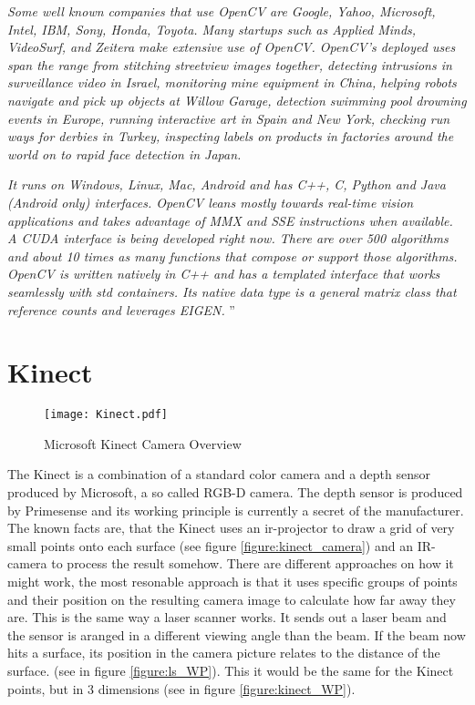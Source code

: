 \textit{ 
Some well known companies that use OpenCV are Google, Yahoo, Microsoft, Intel, IBM, Sony, Honda, Toyota. 
Many startups such as Applied Minds, VideoSurf, and Zeitera make extensive use of OpenCV. OpenCV’s deployed 
uses span the range from stitching streetview images together, detecting intrusions in surveillance video in 
Israel, monitoring mine equipment in China, helping robots navigate and pick up objects at Willow Garage, 
detection swimming pool drowning events in Europe, running interactive art in Spain and New York, checking
run ways for derbies in Turkey, inspecting labels on products in factories around the world on to rapid face
 detection in Japan.
}

\textit{ 
It runs on Windows, Linux, Mac, Android and has C++, C, Python and Java (Android only) interfaces. 
OpenCV leans mostly towards real-time vision applications and takes advantage of MMX and SSE instructions
 when available. A CUDA interface is being developed right now. There are over 500 algorithms and about 10 
 times as many functions that compose or support those algorithms. OpenCV is written natively in C++ and has 
 a templated interface that works seamlessly with std containers. Its native data type is a general matrix class 
 that reference counts and leverages EIGEN.
}''
\section{Kinect}
\begin{figure}[htp]
	\centering
	\texttt{[image: Kinect.pdf]}
	\caption{Microsoft Kinect Camera Overview}
	\label{figure:kinect_camera}
\end{figure}

The Kinect is a combination of a standard color camera and a depth sensor produced by Microsoft, a so called RGB-D camera. 
The depth sensor is produced by Primesense and its working principle is currently a secret of the manufacturer. 
The known facts are, that the Kinect uses an ir-projector to draw a grid of very small points onto each surface 
(see figure \vref{figure:kinect_camera}) and an IR-camera to process the result somehow.  
There are different approaches on how it might work, the most resonable approach is that it uses 
specific groups of points and their position on the resulting camera image to calculate how far 
away they are. This is the same way a laser scanner works. 
It sends out a laser beam and the sensor is aranged in a different viewing angle than the beam.
If the beam now hits a surface, its position in the camera picture relates to the distance of the surface.
(see in figure \vref{figure:ls_WP}). This it would be the same for the Kinect points, but in 3 dimensions 
(see in figure \vref{figure:kinect_WP}).

